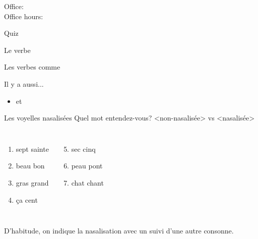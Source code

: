 \documentclass{beamer}
\subtitle[Boissons et verbes]{Les boissons et les verbes \lexi{prendre} et \lexi{boire}}
\begin{document}
  \begin{frame}
    \titlepage
    \tiny{Office: \\
          Office hours: }
  \end{frame}

  \begin{frame}{}
    \begin{center}
      \Large Quiz
    \end{center}
  \end{frame}

  \begin{frame}{Le verbe }
    \begin{center}
      
    \end{center}
  \end{frame}

  \begin{frame}{Les verbes comme }
    \begin{center}
      
    \end{center}
    Il y a aussi...
    \begin{itemize}
      \item {} et 
    \end{itemize}
  \end{frame}

  \begin{frame}{Les voyelles nasalisées}
    Quel mot entendez-vous? <non-nasalisée> vs <nasalisée> \\
    \begin{columns}[t]
        \begin{enumerate}
          \item sept sainte
          \item beau bon
          \item gras grand
          \item ça cent
        \end{enumerate}
        \begin{enumerate}
          \setcounter{enumi}{4}
          \item sec cinq
          \item peau pont
          \item chat chant
        \end{enumerate}
    \end{columns}
    \vspace{0.5cm}
    D'habitude, on indique la nasalisation avec un  suivi d'une autre consonne. \\
  \end{frame}
\end{document}
